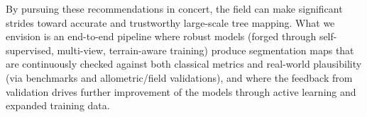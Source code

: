 \documentclass[runningheads]{llncs}
\begin{document}
By pursuing these recommendations in concert, the field can make
significant strides toward accurate and trustworthy large-scale tree
mapping. What we envision is an end-to-end pipeline where robust models
(forged through self-supervised, multi-view, terrain-aware training)
produce segmentation maps that are continuously checked against both
classical metrics and real-world plausibility (via benchmarks and
allometric/field validations), and where the feedback from validation
drives further improvement of the models through active learning and
expanded training data.




\end{document}

